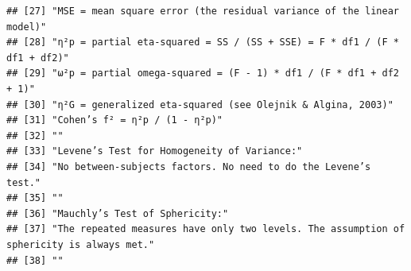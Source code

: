 \documentclass[
  man]{apa6}
\begin{document}
\begin{verbatim}
## [27] "MSE = mean square error (the residual variance of the linear model)"                    
## [28] "η²p = partial eta-squared = SS / (SS + SSE) = F * df1 / (F * df1 + df2)"                
## [29] "ω²p = partial omega-squared = (F - 1) * df1 / (F * df1 + df2 + 1)"                      
## [30] "η²G = generalized eta-squared (see Olejnik & Algina, 2003)"                             
## [31] "Cohen’s f² = η²p / (1 - η²p)"                                                           
## [32] ""                                                                                       
## [33] "Levene’s Test for Homogeneity of Variance:"                                             
## [34] "No between-subjects factors. No need to do the Levene’s test."                          
## [35] ""                                                                                       
## [36] "Mauchly’s Test of Sphericity:"                                                          
## [37] "The repeated measures have only two levels. The assumption of sphericity is always met."
## [38] ""
\end{verbatim}
\end{document}

